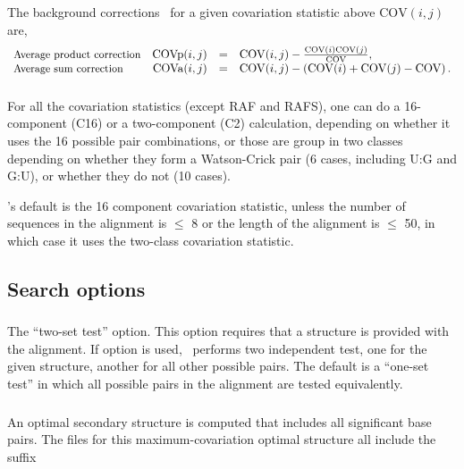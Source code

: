 The background corrections~\citep{DunnGloor07} for a given
covariation statistic above $\mathrm{COV}(i,j)$ are,
%
\[
\begin{array}{lrcl}
  \mbox{\small Average product correction} & \mathrm{COVp}(i,j) & = &  \mathrm{COV}(i,j) - \frac { \mathrm{COV}(i) \mathrm{COV}(j) } { \mathrm{COV} }, \\
  \mbox{\small Average sum correction}     & \mathrm{COVa}(i,j) & = &  \mathrm{COV}(i,j) - \left( \mathrm{COV}(i) + \mathrm{COV}(j) - \mathrm{COV} \right). \\
\end{array}
\]



\subsubsection{}
For all the covariation statistics (except RAF and RAFS), one can do a
16-component (C16) or a two-component (C2) calculation, depending on
whether it uses the 16 possible pair combinations, or those are group
in two classes depending on whether they form a Watson-Crick pair (6
cases, including U:G and G:U), or whether they do not (10 cases).

\rscape's default is the 16 component covariation statistic, unless
the number of sequences in the alignment is $\leq$ 8 or the length of
the alignment is $\leq$ 50, in which case it uses the two-class
covariation statistic.

\subsection{Search options}


\subsubsection{} The ``two-set test'' option.
This option requires that a structure is provided with the alignment.
If option  is used, \rscape\ performs two independent test,
one for the given structure, another for all other possible pairs.
The default is a ``one-set test'' in which all possible pairs in the
alignment are tested equivalently.


\subsubsection{} An optimal secondary structure is computed that includes all significant base pairs. The files for this
maximum-covariation optimal structure all include the suffix

